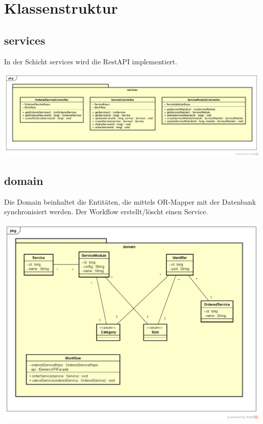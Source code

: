 \documentclass[11pt]{scrartcl}
\begin{document}
\newpage

\section{Klassenstruktur}

\subsection{services}

In der Schicht services wird die RestAPI implementiert.

\begin{center}
\includegraphics[width=\textwidth]{services}
\end{center}

\subsection{domain}

Die Domain beinhaltet die Entitäten, die mittels OR-Mapper mit der Datenbank synchronisiert werden.
Der Workflow erstellt/löscht einen Service.

\begin{center}
\includegraphics[width=\textwidth]{domain}
\end{center}
\end{document}
